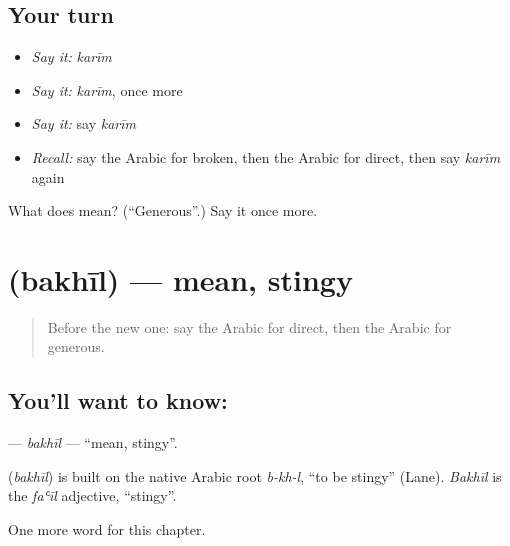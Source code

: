 \subsection*{Your turn}
\begin{itemize}
\raggedright
  \item \emph{Say it:} \emph{karīm}
  \item \emph{Say it:} \emph{karīm}, once more
  \item \emph{Say it:} say \emph{karīm}
  \item \emph{Recall:} say the Arabic for broken, then the Arabic for direct, then say \emph{karīm} again
\end{itemize}

\begin{tcolorbox}[breakable,colback=teal!4,colframe=teal!35!black,title={Before you move on}]
What does  mean? (\textquotedblleft{}Generous\textquotedblright{}.) Say it once more.
\end{tcolorbox}
\section[\texorpdfstring{\ar{بخيل} (bakhīl)}{بخيل (bakhīl)}]{ (bakhīl) — mean, stingy}

\label{lesson:AR-C210-bakhil}



\begin{quote}
Before the new one: say the Arabic for direct, then the Arabic for generous.
\end{quote}

\subsection*{You'll want to know: }
\textbf{} — \emph{bakhīl} — \textquotedblleft{}mean, stingy\textquotedblright{}.

\begin{cousinweb}
\textbf{} (\emph{bakhīl}) is built on the native Arabic root \emph{b-kh-l}, \textquotedblleft{}to be stingy\textquotedblright{} (Lane). \emph{Bakhīl} is the \emph{faʿīl} adjective, \textquotedblleft{}stingy\textquotedblright{}.
\end{cousinweb}

\begin{grammarlens}[title={What you've built}]
One more word for this chapter.
\end{grammarlens}

